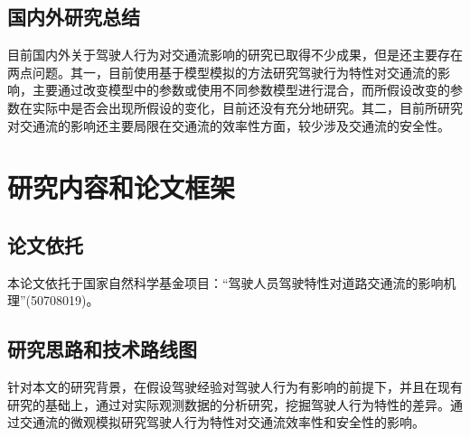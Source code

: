 \subsection{国内外研究总结}

目前国内外关于驾驶人行为对交通流影响的研究已取得不少成果，但是还主要存在两点问题。其一，目前使用基于模型模拟的方法研究驾驶行为特性对交通流的影响，主要通过改变模型中的参数或使用不同参数模型进行混合，而所假设改变的参数在实际中是否会出现所假设的变化，目前还没有充分地研究。其二，目前所研究对交通流的影响还主要局限在交通流的效率性方面，较少涉及交通流的安全性。


%
%

\section{研究内容和论文框架}

\subsection{论文依托}

本论文依托于国家自然科学基金项目：“驾驶人员驾驶特性对道路交通流的影响机理”(50708019)。


\subsection{研究思路和技术路线图}
针对本文的研究背景，在假设驾驶经验对驾驶人行为有影响的前提下，并且在现有研究的基础上，通过对实际观测数据的分析研究，挖掘驾驶人行为特性的差异。通过交通流的微观模拟研究驾驶人行为特性对交通流效率性和安全性的影响。

